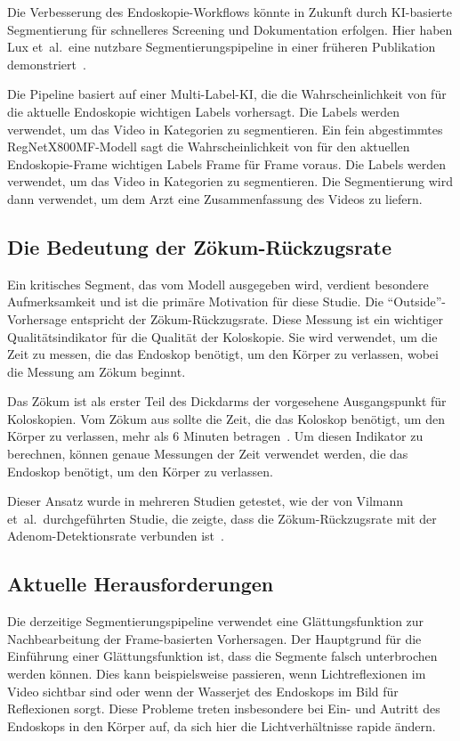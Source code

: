 Die Verbesserung des Endoskopie-Workflows könnte in Zukunft durch KI-basierte Segmentierung für schnelleres Screening und Dokumentation erfolgen. Hier haben Lux et~al.\ eine nutzbare Segmentierungspipeline in einer früheren Publikation demonstriert~\citep{lux-2023}.

Die Pipeline basiert auf einer Multi-Label-KI, die die Wahrscheinlichkeit von für die aktuelle Endoskopie wichtigen Labels vorhersagt. Die Labels werden verwendet, um das Video in Kategorien zu segmentieren. Ein fein abgestimmtes RegNetX800MF-Modell sagt die Wahrscheinlichkeit von für den aktuellen Endoskopie-Frame wichtigen Labels Frame für Frame voraus. Die Labels werden verwendet, um das Video in Kategorien zu segmentieren. Die Segmentierung wird dann verwendet, um dem Arzt eine Zusammenfassung des Videos zu liefern.

\subsection{Die Bedeutung der Zökum-Rückzugsrate}

Ein kritisches Segment, das vom Modell ausgegeben wird, verdient besondere Aufmerksamkeit und ist die primäre Motivation für diese Studie. Die \enquote{Outside}-Vorhersage entspricht der Zökum-Rückzugsrate. Diese Messung ist ein wichtiger Qualitätsindikator für die Qualität der Koloskopie. Sie wird verwendet, um die Zeit zu messen, die das Endoskop benötigt, um den Körper zu verlassen, wobei die Messung am Zökum beginnt. 

Das Zökum ist als erster Teil des Dickdarms der vorgesehene Ausgangspunkt für Koloskopien. Vom Zökum aus sollte die Zeit, die das Koloskop benötigt, um den Körper zu verlassen, mehr als 6 Minuten betragen~\citep{profanter-2020,leung-2019}. Um diesen Indikator zu berechnen, können genaue Messungen der Zeit verwendet werden, die das Endoskop benötigt, um den Körper zu verlassen.

Dieser Ansatz wurde in mehreren Studien getestet, wie der von Vilmann et~al.\ durchgeführten Studie, die zeigte, dass die Zökum-Rückzugsrate mit der Adenom-Detektionsrate verbunden ist~\citep{vilmann-2022}.

\subsection{Aktuelle Herausforderungen}

Die derzeitige Segmentierungspipeline verwendet eine Glättungsfunktion zur Nachbearbeitung der Frame-basierten Vorhersagen. Der Hauptgrund für die Einführung einer Glättungsfunktion ist, dass die Segmente falsch unterbrochen werden können. Dies kann beispielsweise passieren, wenn Lichtreflexionen im Video sichtbar sind oder wenn der Wasserjet des Endoskops im Bild für Reflexionen sorgt.
Diese Probleme treten insbesondere bei Ein- und Autritt des Endoskops in den Körper auf, da sich hier die Lichtverhältnisse rapide ändern.

